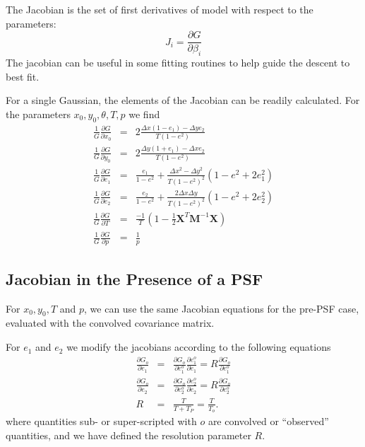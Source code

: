\documentclass[12pt,preprint]{aastex}
\newcommand{\M}{\textbf{M}}
\newcommand{\X}{\textbf{X}}
\newcommand{\Dx}{\ensuremath{\Delta x}}
\newcommand{\Dy}{\ensuremath{\Delta y}}
\begin{document}
The Jacobian is the set of first derivatives of model with respect
to the parameters:
\begin{equation}
J_i = \frac{\partial G}{\partial \beta_i}
\end{equation}
The jacobian can be useful in some fitting routines to help guide the descent
to best fit.

For a single Gaussian, the elements of the Jacobian can be readily
calculated.  For the parameters $x_0,y_0,\theta,T,p$ we find
\begin{eqnarray}
\frac{1}{G} \frac{\partial G}{\partial x_0}
    & = & 2 \frac{ \Dx (1-e_1) - \Dy e_2 }{T (1-e^2)} \\
\frac{1}{G} \frac{\partial G}{\partial y_0}
    & = & 2 \frac{ \Dy (1+e_1) - \Dx e_2 }{T (1-e^2)} \\
\frac{1}{G} \frac{\partial G}{\partial e_1}
  & = & \frac{e_1}{1-e^2} + \frac{\Dx^2-\Dy^2}{T (1-e^2)^2} (1-e^2 + 2 e_1^2) \\
\frac{1}{G} \frac{\partial G}{\partial e_2}
  & = & \frac{e_2}{1-e^2} + \frac{2 \Dx \Dy}{T (1-e^2)^2} (1-e^2 + 2 e_2^2) \\
\frac{1}{G} \frac{\partial G}{\partial T}
  & = & \frac{-1}{T} \left( 1 - \frac{1}{2} \X^T \M^{-1} \X  \right)  \\
\frac{1}{G} \frac{\partial G}{\partial p}
  & = & \frac{1}{p}
\end{eqnarray}

\subsection{Jacobian in the Presence of a PSF}

For $x_0,y_0,T$ and $p$, we can use the same Jacobian equations for the pre-PSF
case, evaluated with the convolved covariance matrix. 

For $e_1$ and $e_2$ we modify the jacobians according to the following equations
\begin{eqnarray}
\frac{\partial G_o}{\partial e_1} 
 & = & \frac{\partial G_o}{\partial e_1^o} \frac{\partial e_1^o}{\partial e_1} 
    =  R \frac{\partial G_o}{\partial e_1^o}\\
\frac{\partial G_o}{\partial e_2} 
 & = & \frac{\partial G_o}{\partial e_2^o} \frac{\partial e_2^o}{\partial e_2}
    =  R \frac{\partial G_o}{\partial e_2^o}\\
R & = & \frac{T}{T + T_P} = \frac{T}{T_o}.
\end{eqnarray}
where quantities sub- or super-scripted with $o$ are convolved or ``observed''
quantities, and we have defined the resolution parameter $R$.
\end{document}
